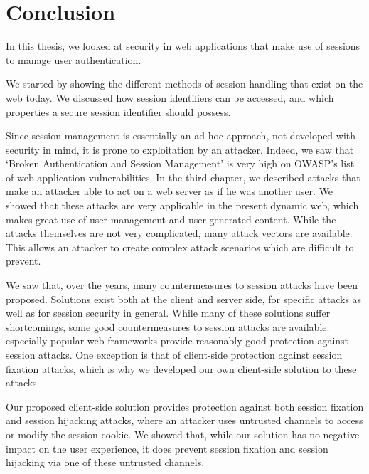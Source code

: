 \chapter{Conclusion}

In this thesis, we looked at security in web applications that make use of sessions to manage user authentication.

We started by showing the different methods of session handling that exist on the web today. We discussed how session identifiers can be accessed, and which properties a secure session identifier should possess.

Since session management is essentially an ad hoc approach, not developed with security in mind, it is prone to exploitation by an attacker. Indeed, we saw that `Broken Authentication and Session Management' is very high on OWASP's list of web application vulnerabilities. In the third chapter, we described attacks that make an attacker able to act on a web server as if he was another user. We showed that these attacks are very applicable in the present dynamic web, which makes great use of user management and user generated content. While the attacks themselves are not very complicated, many attack vectors are available. This allows an attacker to create complex attack scenarios which are difficult to prevent.

We saw that, over the years, many countermeasures to session attacks have been proposed. Solutions exist both at the client and server side, for specific attacks as well as for session security in general. While many of these solutions suffer shortcomings, some good countermeasures to session attacks are available: especially popular web frameworks provide reasonably good protection against session attacks. One exception is that of client-side protection against session fixation attacks, which is why we developed our own client-side solution to these attacks.

Our proposed client-side solution provides protection against both session fixation and session hijacking attacks, where an attacker uses untrusted channels to access or modify the session cookie. We showed that, while our solution has no negative impact on the user experience, it does prevent session fixation and session hijacking via one of these untrusted channels.
